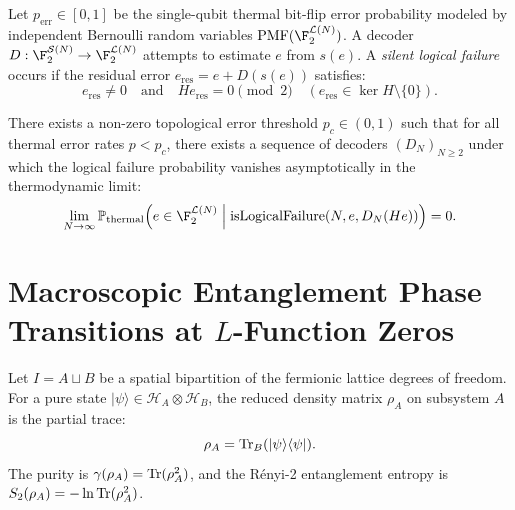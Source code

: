 \begin{definition}
\label{def:qec_noise_and_failure}
\leanok
Let $p_{\mathrm{err}} \in [0, 1]$ be the single-qubit thermal bit-flip error probability modeled by independent Bernoulli random variables $\mathrm{PMF}(\F_2^{\mathcal{L}(N)})$. A decoder $D : \F_2^{\mathcal{S}(N)} \to \F_2^{\mathcal{L}(N)}$ attempts to estimate $e$ from $s(e)$. A \emph{silent logical failure} occurs if the residual error $e_{\mathrm{res}} = e + D(s(e))$ satisfies:
\[
e_{\mathrm{res}} \neq 0 \quad \text{and} \quad H e_{\mathrm{res}} = 0 \pmod 2 \quad (e_{\mathrm{res}} \in \ker H \setminus \{0\}).
\]
\end{definition}

\begin{theorem}
\label{thm:qec_threshold_exists}
\leanok
There exists a non-zero topological error threshold $p_c \in (0, 1)$ such that for all thermal error rates $p < p_c$, there exists a sequence of decoders $(D_N)_{N \ge 2}$ under which the logical failure probability vanishes asymptotically in the thermodynamic limit:
\[
\lim_{N \to \infty} \mathbb{P}_{\mathrm{thermal}}\Big( e \in \F_2^{\mathcal{L}(N)} \;\Big|\; \text{isLogicalFailure}(N, e, D_N(H e)) \Big) = 0.
\]
\end{theorem}

\section{Macroscopic Entanglement Phase Transitions at $L$-Function Zeros}

\begin{definition}
\label{def:many_body_entanglement}
\leanok
Let $I = A \sqcup B$ be a spatial bipartition of the fermionic lattice degrees of freedom. For a pure state $|\psi\rangle \in \mathcal{H}_A \otimes \mathcal{H}_B$, the reduced density matrix $\rho_A$ on subsystem $A$ is the partial trace:
\[
\rho_A = \mathrm{Tr}_B(|\psi\rangle \langle \psi|).
\]
The purity is $\gamma(\rho_A) = \mathrm{Tr}(\rho_A^2)$, and the Rényi-2 entanglement entropy is $S_2(\rho_A) = -\ln \mathrm{Tr}(\rho_A^2)$.
\end{definition}

